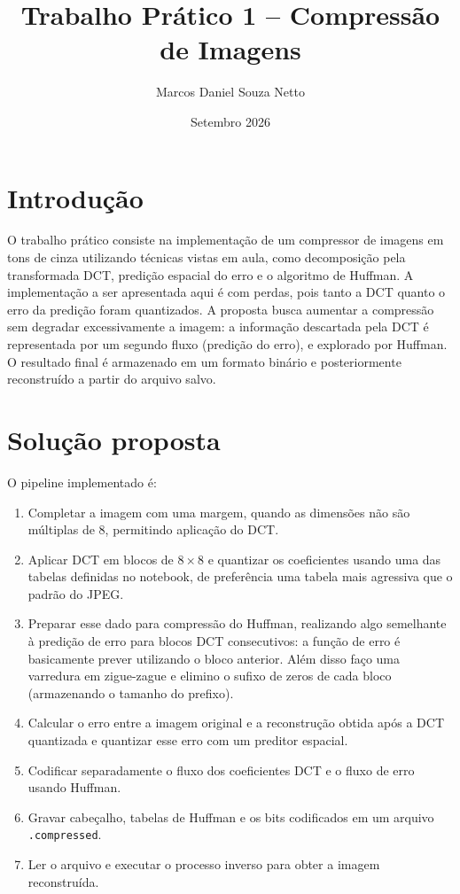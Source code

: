 \documentclass{article}
\title{Trabalho Prático 1 -- Compressão de Imagens}
\author{Marcos Daniel Souza Netto}
\date{Setembro 2026}
\begin{document}
\maketitle
\section{Introdução}
O trabalho prático consiste na implementação de um compressor de imagens em tons de cinza utilizando técnicas vistas em aula, como decomposição pela transformada DCT, predição espacial do erro e o algoritmo de Huffman. A implementação a ser apresentada aqui é com perdas, pois tanto a DCT quanto o erro da predição foram quantizados. A proposta busca aumentar a compressão sem degradar excessivamente a imagem: a informação descartada pela DCT é representada por um segundo fluxo (predição do erro), e explorado por Huffman. O resultado final é armazenado em um formato binário e posteriormente reconstruído a partir do arquivo salvo.

\section{Solução proposta}
O pipeline implementado é:
\begin{enumerate}
    \item Completar a imagem com uma margem, quando as dimensões não são múltiplas de 8, permitindo aplicação do DCT.
    \item Aplicar DCT em blocos de $8\times8$ e quantizar os coeficientes usando uma das tabelas definidas no notebook, de preferência uma tabela mais agressiva que o padrão do JPEG.
    \item Preparar esse dado para compressão do Huffman, realizando algo semelhante à predição de erro para blocos DCT consecutivos: a função de erro é basicamente prever utilizando o bloco anterior. Além disso faço uma varredura em zigue-zague e elimino o sufixo de zeros de cada bloco (armazenando o tamanho do prefixo).
    \item Calcular o erro entre a imagem original e a reconstrução obtida após a DCT quantizada e quantizar esse erro com um preditor espacial.
    \item Codificar separadamente o fluxo dos coeficientes DCT e o fluxo de erro usando Huffman.
    \item Gravar cabeçalho, tabelas de Huffman e os bits codificados em um arquivo \texttt{.compressed}.
    \item Ler o arquivo e executar o processo inverso para obter a imagem reconstruída.
\end{enumerate}
\end{document}
